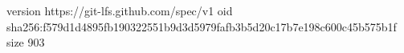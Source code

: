 version https://git-lfs.github.com/spec/v1
oid sha256:f579d1d4895fb190322551b9d3d5979fafb3b5d20c17b7e198c600c45b575b1f
size 903
